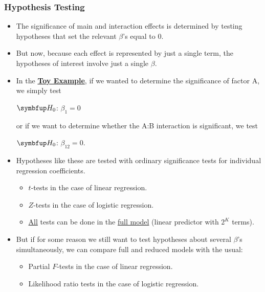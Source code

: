 \subsubsection*{Hypothesis Testing}
\begin{itemize}
    \item The significance of main and interaction effects is determined by testing hypotheses that set the relevant
          $ \beta $'s equal to $ 0 $.
\end{itemize}
\begin{itemize}[*]
    \item But now, because each effect is represented by just a single term, the hypotheses of interest involve
          just a single $ \beta $.
\end{itemize}
\begin{itemize}
    \item In the \hyperref[ex:toy_ex]{\textbf{Toy Example}}, if we wanted to determine the significance of factor A, we simply test
          \begin{tightcenter}
              $ \HN $: $ \beta_1=0 $
          \end{tightcenter}
          or if we want to determine whether the A:B interaction is significant, we test
          \begin{tightcenter}
              $ \HN $: $ \beta_{12}=0 $.
          \end{tightcenter}
    \item Hypotheses like these are tested with ordinary significance tests for individual regression coefficients.
          \begin{itemize}
              \item $ t $-tests in the case of linear regression.
              \item $ Z $-tests in the case of logistic regression.
          \end{itemize}
          \begin{itemize}[*]
              \item \underline{All} tests can be done in the \underline{full model} (linear predictor with $ 2^K $ terms).
          \end{itemize}
\end{itemize}
\begin{itemize}[$\rightarrow$]
    \item But if for some reason we still want to test hypotheses about several $ \beta $'s simultaneously, we can compare
          full and reduced models with the usual:
          \begin{itemize}
              \item Partial $ F $-tests in the case of linear regression.
              \item Likelihood ratio tests in the case of logistic regression.
          \end{itemize}
\end{itemize}
